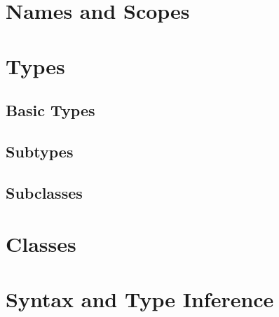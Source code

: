 
\chapter{Names and Scopes}

\chapter{Types}
\section{Basic Types}
\section{Subtypes}
\section{Subclasses}

\chapter{Classes}

\chapter{Syntax and Type Inference}
